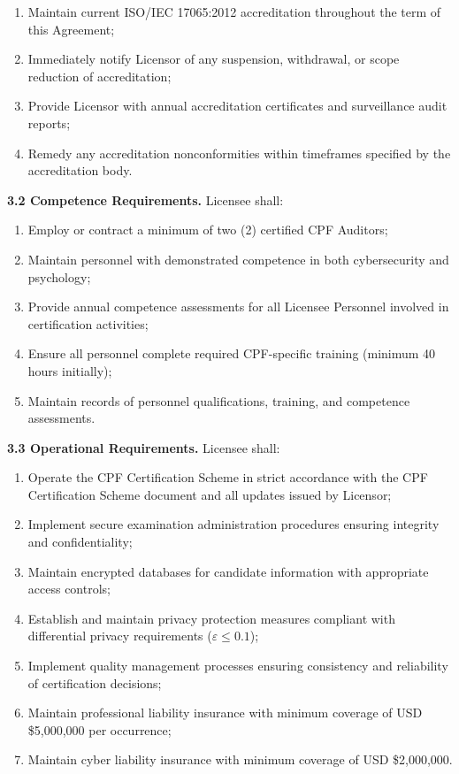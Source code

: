 \documentclass[11pt,a4paper]{article}
\begin{document}
\begin{enumerate}[label=\alph*)]
\item Maintain current ISO/IEC 17065:2012 accreditation throughout the term of this Agreement;
\item Immediately notify Licensor of any suspension, withdrawal, or scope reduction of accreditation;
\item Provide Licensor with annual accreditation certificates and surveillance audit reports;
\item Remedy any accreditation nonconformities within timeframes specified by the accreditation body.
\end{enumerate}

\textbf{3.2 Competence Requirements.} Licensee shall:

\begin{enumerate}[label=\alph*)]
\item Employ or contract a minimum of two (2) certified CPF Auditors;
\item Maintain personnel with demonstrated competence in both cybersecurity and psychology;
\item Provide annual competence assessments for all Licensee Personnel involved in certification activities;
\item Ensure all personnel complete required CPF-specific training (minimum 40 hours initially);
\item Maintain records of personnel qualifications, training, and competence assessments.
\end{enumerate}

\textbf{3.3 Operational Requirements.} Licensee shall:

\begin{enumerate}[label=\alph*)]
\item Operate the CPF Certification Scheme in strict accordance with the CPF Certification Scheme document and all updates issued by Licensor;
\item Implement secure examination administration procedures ensuring integrity and confidentiality;
\item Maintain encrypted databases for candidate information with appropriate access controls;
\item Establish and maintain privacy protection measures compliant with differential privacy requirements ($\varepsilon \leq 0.1$);
\item Implement quality management processes ensuring consistency and reliability of certification decisions;
\item Maintain professional liability insurance with minimum coverage of USD \$5,000,000 per occurrence;
\item Maintain cyber liability insurance with minimum coverage of USD \$2,000,000.
\end{enumerate}
\end{document}
